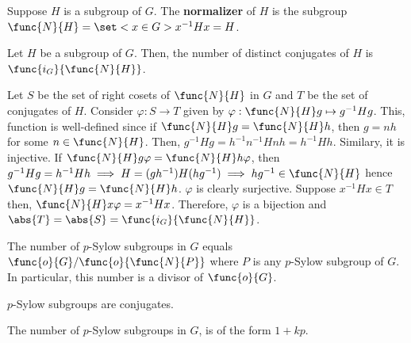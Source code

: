 \begin{definition}
    Suppose \(H\) is a subgroup of \(G\). The \textbf{normalizer} of \(H\) is the subgroup \(\func{N}{H}= \set<x \in G>{x^{-1}Hx = H}\).
\end{definition}

\begin{lemma}
    Let \(H\) be a subgroup of \(G\). Then, the number of distinct conjugates of \(H\) is \(\func{i_G}{\func{N}{H}}\).
\end{lemma}

\begin{prooflemma}
    Let \(S\) be the set of right cosets of \(\func{N}{H}\) in \(G\) and \(T\) be the set of conjugates of \(H\). Consider \(\varphi : S \to T\) given by \(\varphi: \func{N}{H}g \mapsto g^{-1}Hg\). This, function is well-defined since if \(\func{N}{H}g = \func{N}{H}h\), then \(g = nh\) for some \(n \in \func{N}{H}\). Then, \(g^{-1}Hg = h^{-1}n^{-1}Hnh = h^{-1}Hh\). Similary, it is injective. If \(\func{N}{H}g \varphi = \func{N}{H}h \varphi\), then \(g^{-1}Hg = h^{-1}H h \implies H =(gh^{-1})H (hg^{-1}) \implies hg^{-1} \in \func{N}{H}\) hence \(\func{N}{H}g = \func{N}{H}h\). \(\varphi\) is clearly surjective. Suppose \(x^{-1}Hx\in T\) then, \(\func{N}{H}x \varphi = x^{-1}Hx\). Therefore, \(\varphi\) is a bijection and \(\abs{T} =\abs{S} =  \func{i_G}{\func{N}{H}}\).
\end{prooflemma}

\begin{corollary}
    The number of \(p\)-Sylow subgroups in \(G\) equals \(\func{o}{G}/\func{o}{\func{N}{P}}\) where \(P\) is any \(p\)-Sylow subgroup of \(G\). In particular, this number is a divisor of \(\func{o}{G}\).
\end{corollary}

\begin{prooflemma}
    \(p\)-Sylow subgroups are conjugates.
\end{prooflemma}

\begin{theorem}
    The number of \(p\)-Sylow subgroups in \(G\), is of the form \(1 + kp\).
\end{theorem}


